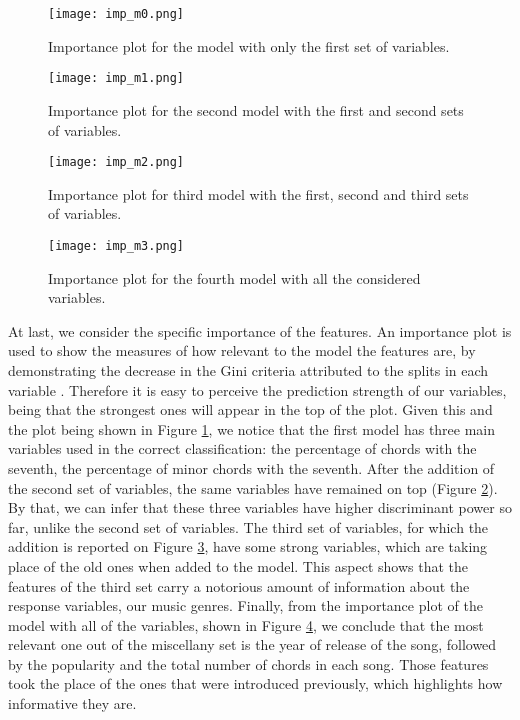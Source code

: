 \documentclass[twocolumn]{article}
\begin{document}
\begin{figure}[h]
\centering
\texttt{[image: imp\_m0.png]}
\caption{Importance plot for the model
with only the first set of variables.}
\label{fig:imp0}
\end{figure}

\begin{figure}[h]
\centering
\texttt{[image: imp\_m1.png]}
\caption{Importance plot for the second model
with the first and second sets of variables.}
\label{fig:imp1}
\end{figure}

\begin{figure}[h]
\centering
\texttt{[image: imp\_m2.png]}
\caption{Importance plot for third model with the first, second and third sets of variables.}
\label{fig:imp2}
\end{figure}

\begin{figure}[h]
\centering
\texttt{[image: imp\_m3.png]}
\caption{Importance plot for the fourth model with all the considered variables.}
\label{fig:imp3}
\end{figure}

At last, we consider the specific importance of the 
features. An importance plot is used to show the measures
of how relevant to the model the features are,
by demonstrating the decrease in the Gini criteria
attributed to the splits in each variable \cite{Hastie}.
Therefore it is easy to perceive the prediction
strength of our variables, being that the strongest
ones will appear in the top of the plot. 
Given this and the plot being shown in 
Figure \ref{fig:imp0}, we notice that 
the first model has three main variables used in the correct
classification: the percentage of chords with the
seventh, the percentage of minor chords with the seventh. 
After the addition of the second set of variables, 
the same variables have remained on top (Figure \ref{fig:imp1}).
By that, we can infer that these three variables have higher discriminant power so far, unlike the second set of variables. 
The third set of variables, for which the addition
is reported on Figure \ref{fig:imp2},
have some strong variables, which are taking 
place of the old ones when added to the model.
This aspect shows that the features of the third
set carry a notorious amount of information about the 
response variables, our music genres. 
Finally, from the importance plot of the model 
with all of the variables, shown in Figure \ref{fig:imp3}, 
we conclude that the most relevant one out of the miscellany
set is the year of release of the song, followed by 
the popularity and the total number of chords in each song.
Those features took the place of the ones that were introduced
previously, which highlights how informative they are. 
\end{document}
